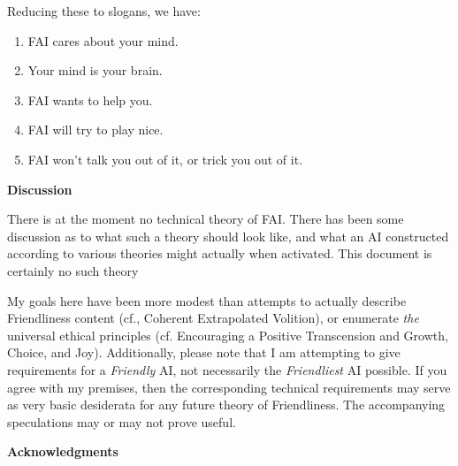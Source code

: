 \documentclass[twoside,11pt]{article}
\begin{document}
Reducing these to slogans, we have: \begin{enumerate}
\item FAI cares about your mind.
\item Your mind is your brain.
\item FAI wants to help you.
\item FAI will try to play nice.
\item FAI won't talk you out of it, or trick you out of it.
\end{enumerate}

\textbf{Discussion}

There is at the moment no technical theory of FAI. There has been some
discussion as to what such a theory should look like, and what an AI 
constructed according to various theories might actually when activated. This
document is certainly no such theory

My goals here have been more modest than attempts to actually describe
Friendliness content (cf., Coherent Extrapolated Volition), or enumerate
\emph{the} universal ethical principles (cf.  Encouraging a Positive
Transcension and Growth, Choice, and Joy). Additionally, please note that I am
attempting to give requirements for a \emph{Friendly} AI, not necessarily the
\emph{Friendliest} AI possible. If you agree with my premises, then the
corresponding technical requirements may serve as very basic desiderata for any
future theory of Friendliness. The accompanying speculations may or may not
prove useful.

\textbf{Acknowledgments}



\end{document}
